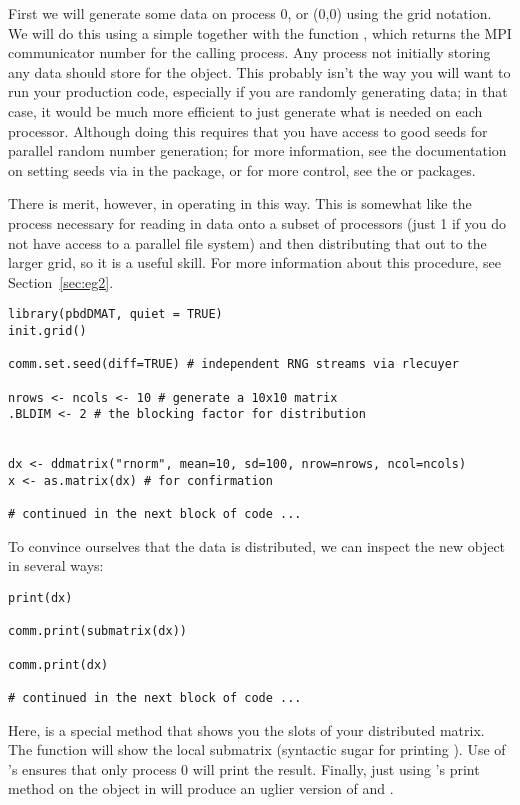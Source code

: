 First we will generate some data on process 0, or (0,0) using the grid notation.  We will do this using a simple  together with the  function , which returns the MPI communicator number for the calling process.  Any process not initially storing any data should store  for the object.  This probably isn't the way you will want to run your production code, especially if you are randomly generating data; in that case, it would be much more efficient to just generate what is needed on each processor.  Although doing this requires that you have access to good seeds for parallel random number generation; for more information, see the documentation on setting seeds via  in the  package, or for more control, see the  or  packages.  

There is merit, however, in operating in this way.  This is somewhat like the process necessary for reading in data onto a subset of processors (just 1 if you do not have access to a parallel file system) and then distributing that out to the larger grid, so it is a useful skill.  For more information about this procedure, see Section~\ref{sec:eg2}.

\begin{lstlisting}[language=rr,title=Generating Test Data]
library(pbdDMAT, quiet = TRUE)
init.grid()

comm.set.seed(diff=TRUE) # independent RNG streams via rlecuyer

nrows <- ncols <- 10 # generate a 10x10 matrix
.BLDIM <- 2 # the blocking factor for distribution


dx <- ddmatrix("rnorm", mean=10, sd=100, nrow=nrows, ncol=ncols)
x <- as.matrix(dx) # for confirmation

# continued in the next block of code ...
\end{lstlisting}

To convince ourselves that the data is distributed, we can inspect the new object in several ways:

\begin{lstlisting}[language=rr,title=Printing the Object]
print(dx)

comm.print(submatrix(dx))

comm.print(dx)
 
# continued in the next block of code ...
\end{lstlisting}

Here,  is a special method that shows you the slots of your distributed matrix.  The  function will show the local submatrix (syntactic sugar for printing ).  Use of 's  ensures that only process 0 will print the result.  Finally, just using 's print method on the object in  will produce an uglier version of  and .


